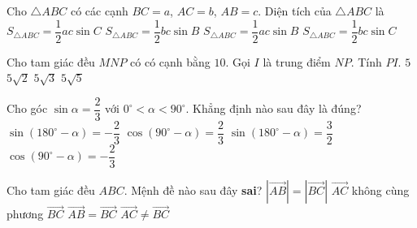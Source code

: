 \begin{ex}%
	Cho $\triangle ABC$ có các cạnh $BC=a$, $AC=b$, $AB=c$. Diện tích của $\triangle ABC$ là
	\choice
	{$S_{\triangle ABC}=\dfrac{1}{2}ac\sin C$}
	{$S_{\triangle ABC}=\dfrac{1}{2}bc\sin B$}
	{\True $S_{\triangle ABC}=\dfrac{1}{2}ac\sin B$}
	{$S_{\triangle ABC}=\dfrac{1}{2}bc\sin C$}
\end{ex}

\begin{ex}%
	Cho tam giác đều $ MNP $ có có cạnh bằng $10$. Gọi $I$ là trung điểm $NP$. Tính $PI$.
	\choice
	{$ 5 $}
	{$ 5\sqrt{2}$}
	{\True $ 5\sqrt{3} $}
	{$  5\sqrt{5}$}

\end{ex}

\begin{ex}%
	Cho góc $\sin\alpha=\dfrac{2}{3}$ với $0^\circ <\alpha <90^\circ$. Khẳng định nào sau đây là đúng?
	\choice
	{$\sin\left(180^\circ -\alpha\right) = -\dfrac{2}{3}$}
	{\True $\cos\left(90^\circ -\alpha\right)=\dfrac{2}{3}$}
	{$\sin\left(180^\circ -\alpha\right) = \dfrac{3}{2}$}
	{$\cos\left(90^\circ -\alpha\right)=-\dfrac{2}{3}$}
\end{ex}

\begin{ex}%
	Cho tam giác đều $ABC$. Mệnh đề nào sau đây \textbf{sai}?
	\choice
	{$\left|\overrightarrow{AB}\right|=\left|\overrightarrow{BC}\right|$}
	{$\overrightarrow{AC}$ không cùng phương $\overrightarrow{BC}$}
	{\True $\overrightarrow{AB}=\overrightarrow{BC}$}
	{$\overrightarrow{AC}\neq \overrightarrow{BC}$}
\end{ex}

